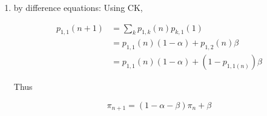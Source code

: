 \documentclass[a4paper]{article}
\begin{document}
\begin{eg}
\begin{enumerate}
	\item by difference equations:
	Using CK,
	
	\begin{align*}
	p_{1,1}(n+1) & = \sum_{k} p_{1,k}(n) p_{k,1}(1) \\
	& = p_{1,1}(n)(1-\alpha) + p_{1,2} (n) \beta   \\
	& =  p_{1,1}(n)(1-\alpha) + (1 - p_{1,1(n)}) \beta  
	\end{align*}
	
	Thus
	
	\[ \pi_{n+1} = (1 - \alpha - \beta)\pi_{n} + \beta \]
	
	
	
\end{enumerate}
\end{eg}


  
\end{document}
